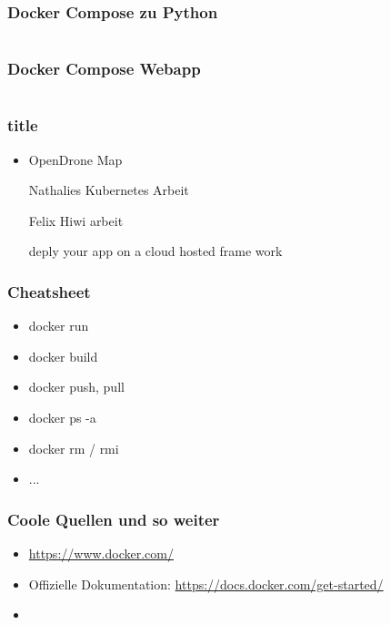 \documentclass[22pt]{beamer}
\begin{document}
\begin{frame}[fragile]
    \frametitle{Docker Compose zu Python}
    \inputminted[fontsize=\footnotesize, frame=lines]{dockerfile}{../examples/Dockerfile.cmd}
\end{frame}

\begin{frame}[fragile]
    \frametitle{Docker Compose Webapp}
    \inputminted[fontsize=\footnotesize, frame=lines]{dockerfile}{../examples/Dockerfile.cmd}
\end{frame}

\begin{frame}[t]
    \frametitle{title}
    \begin{itemize}
        \item OpenDrone Map
        \item [Nathalies Kubernetes Arbeit]
        \item [Felix Hiwi arbeit]
        \item [deply your app on a cloud hosted frame work]
    \end{itemize}
\end{frame}

\begin{frame}[t]
    \frametitle{Cheatsheet}
    \begin{itemize}
        \item docker run
        \item docker build
        \item docker push, pull
        \item docker ps -a
        \item docker rm / rmi
        \item ...
    \end{itemize} 
\end{frame}

\begin{frame}[t]
    \frametitle{Coole Quellen und so weiter}
    \begin{itemize}
        \item \href{https://www.docker.com/}{https://www.docker.com/}
        \item Offizielle Dokumentation: \href{https://docs.docker.com/get-started/}{https://docs.docker.com/get-started/}
        \item 
    \end{itemize} 
\end{frame}
\end{document}
